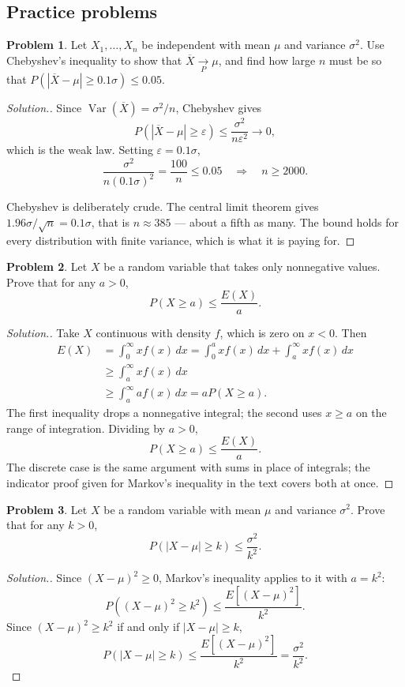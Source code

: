 \documentclass[11pt,a4paper]{article}
\theoremstyle{definition}
\newtheorem{problemx}{Problem}[subsection]
\newenvironment{problem}{\begin{problemx}}{\end{problemx}}
\newenvironment{solution}
  {\renewcommand{\qedsymbol}{}\begin{proof}[\textit{Solution}.]}
  {\end{proof}}
\DeclareMathOperator{\Var}{Var}
\begin{document}
\subsection{Practice problems}

\begin{problem}
Let $X_1,\dots,X_n$ be independent with mean $\mu$ and variance $\sigma^{2}$.
Use Chebyshev's inequality to show that $\overline{X}\underset{P}{\longrightarrow}\mu$,
and find how large $n$ must be so that
$P\left(\left|\overline{X}-\mu\right|\geq 0.1\sigma\right)\leq 0.05$.
\end{problem}
\begin{solution}
Since $\Var\left(\overline{X}\right) = \sigma^{2}/n$, Chebyshev gives
$$P\left(\left|\overline{X}-\mu\right|\geq\varepsilon\right)
\leq \frac{\sigma^{2}}{n\varepsilon^{2}} \longrightarrow 0 ,$$
which is the weak law. Setting $\varepsilon = 0.1\sigma$,
$$\frac{\sigma^{2}}{n(0.1\sigma)^{2}} = \frac{100}{n} \leq 0.05
\quad\Longrightarrow\quad n \geq 2000 .$$

Chebyshev is deliberately crude. The central limit theorem gives
$1.96\sigma/\sqrt{n} = 0.1\sigma$, that is $n\approx 385$ --- about a fifth as
many. The bound holds for every distribution with finite variance, which is what
it is paying for.
\end{solution}

\begin{problem}
Let $X$ be a random variable that takes only nonnegative values. Prove that for
any $a>0$,
$$P(X\geq a)\leq\frac{E(X)}{a}.$$
\end{problem}
\begin{solution}
Take $X$ continuous with density $f$, which is zero on $x<0$. Then
\begin{align*}
E(X) &= \int_0^{\infty}xf(x)\,dx
= \int_0^{a}xf(x)\,dx + \int_a^{\infty}xf(x)\,dx\\
&\geq \int_a^{\infty}xf(x)\,dx\\
&\geq \int_a^{\infty}af(x)\,dx = aP(X\geq a).
\end{align*}
The first inequality drops a nonnegative integral; the second uses $x\geq a$ on
the range of integration. Dividing by $a>0$,
$$P(X\geq a)\leq\frac{E(X)}{a}.$$
The discrete case is the same argument with sums in place of integrals; the
indicator proof given for Markov's inequality in the text covers both at once.
\end{solution}

\begin{problem}
Let $X$ be a random variable with mean $\mu$ and variance $\sigma^{2}$. Prove
that for any $k>0$,
$$P\left(|X-\mu|\geq k\right)\leq\frac{\sigma^{2}}{k^{2}}.$$
\end{problem}
\begin{solution}
Since $(X-\mu)^{2}\geq0$, Markov's inequality applies to it with $a=k^{2}$:
$$P\left((X-\mu)^{2}\geq k^{2}\right)\leq\frac{E\left[(X-\mu)^{2}\right]}{k^{2}}.$$
Since $(X-\mu)^{2}\geq k^{2}$ if and only if $|X-\mu|\geq k$,
$$P\left(|X-\mu|\geq k\right)\leq\frac{E\left[(X-\mu)^{2}\right]}{k^{2}}
= \frac{\sigma^{2}}{k^{2}}.$$
\end{solution}
\end{document}
